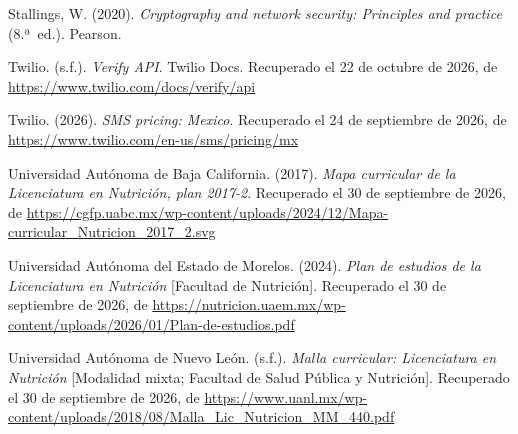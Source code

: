 \documentclass[12pt, a4paper]{article}
\begin{document}
\begin{list}{}{\setlength{\leftmargin}{1.27cm}\setlength{\itemindent}{-1.27cm}%
  \setlength{\labelwidth}{0pt}\setlength{\labelsep}{0pt}\setlength{\itemsep}{6pt}}
\item Stallings, W. (2020). \textit{Cryptography and network
  security: Principles and practice} (8.ª~ed.). Pearson.

 
\item Twilio. (s.f.). \textit{Verify API}. Twilio Docs. Recuperado el 22 de octubre de 2026, de \url{https://www.twilio.com/docs/verify/api}
 
 
\item Twilio. (2026). \textit{SMS pricing: Mexico}. Recuperado el 24 de
  septiembre de 2026, de \url{https://www.twilio.com/en-us/sms/pricing/mx}
 
  
\item Universidad Autónoma de Baja California. (2017). \textit{Mapa curricular
  de la Licenciatura en Nutrición, plan 2017-2}.
  Recuperado el 30 de septiembre de 2026, de \url{https://cgfp.uabc.mx/wp-content/uploads/2024/12/Mapa-curricular_Nutricion_2017_2.svg}
 
 
\item Universidad Autónoma del Estado de Morelos. (2024). \textit{Plan de
  estudios de la Licenciatura en Nutrición} [Facultad de Nutrición].
  Recuperado el 30 de septiembre de 2026, de \url{https://nutricion.uaem.mx/wp-content/uploads/2026/01/Plan-de-estudios.pdf}
 
 
\item Universidad Autónoma de Nuevo León. (s.f.). \textit{Malla curricular:
  Licenciatura en Nutrición} [Modalidad mixta; Facultad de Salud Pública
  y Nutrición].
  Recuperado el 30 de septiembre de 2026, de \url{https://www.uanl.mx/wp-content/uploads/2018/08/Malla_Lic_Nutricion_MM_440.pdf}
 
 

\end{list}
\end{document}

